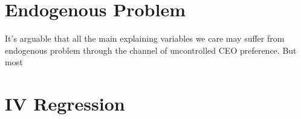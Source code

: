\documentclass{article}
\begin{document}
\newpage
\section{Endogenous Problem}\label{sec:endogenous}
It's arguable that all the main explaining variables we care may suffer from endogenous problem through the channel of uncontrolled CEO preference. But most 

\section{IV Regression}\label{sec:IV}

\begin{appendix}\label{sec:appendix}
\nocite{*}


\end{appendix}
\end{document}
